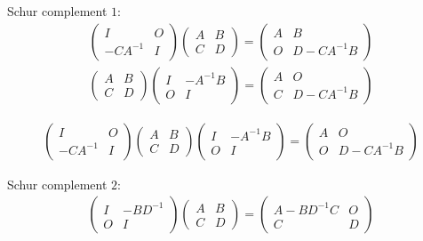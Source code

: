 Schur complement $1$:
\begin{align*}
  \begin{pmatrix}
    I & O \\
    -CA^{-1} & I
  \end{pmatrix} 
  \begin{pmatrix}
    A & B \\
    C & D
  \end{pmatrix} =  
  \begin{pmatrix}
    A & B \\
    O & D-CA^{-1}B  
  \end{pmatrix}  
\end{align*}
\begin{align*}
  \begin{pmatrix}
    A & B \\
    C & D
  \end{pmatrix} 
  \begin{pmatrix}
    I & -A^{-1}B \\
    O & I  
  \end{pmatrix} =  
  \begin{pmatrix}
    A & O \\
    C & D-CA^{-1}B  
  \end{pmatrix}
\end{align*}

\begin{align*}
  \begin{pmatrix}
    I & O \\
    -CA^{-1} & I
  \end{pmatrix} 
  \begin{pmatrix}
    A & B \\
    C & D
  \end{pmatrix} 
  \begin{pmatrix}
    I & -A^{-1}B \\
    O & I  
  \end{pmatrix} =  
  \begin{pmatrix}
    A & O \\
    O & D-CA^{-1}B  
  \end{pmatrix}  
\end{align*}

Schur complement $2$:
\begin{align*}
  \begin{pmatrix}
    I & -BD^{-1} \\
    O & I
  \end{pmatrix} 
  \begin{pmatrix}
    A & B \\
    C & D
  \end{pmatrix} =  
  \begin{pmatrix}
    A-BD^{-1}C & O \\
    C & D  
  \end{pmatrix}  
\end{align*}

